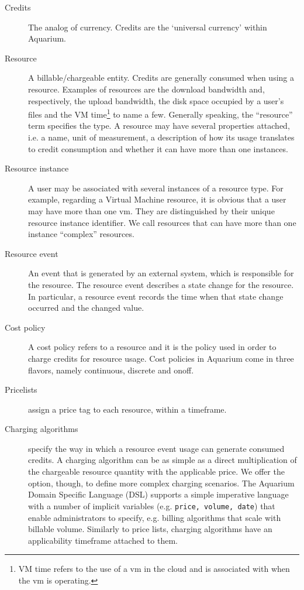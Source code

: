 \documentclass[preprint,10pt]{sigplanconf}
\begin{document}
\begin{description}
\item[Credits]
The analog of currency. Credits are the `universal currency' within Aquarium.

\item[Resource]
    A billable/chargeable entity. Credits are generally consumed when using a resource. Examples of resources are the \textsf{download bandwidth} and, respectively,  the \textsf{upload bandwidth}, the \textsf{disk space} occupied by a user's files and the \textsf{VM time}\footnote{\textsf{VM time} refers to the use of a {\sc vm} in the cloud and is associated with when the {\sc vm} is operating.} to name a few. Generally speaking, the ``resource'' term specifies the type. A resource may have several properties attached, i.e. a name, unit of measurement, a description of how its usage translates to credit consumption and whether it can have more than one instances.

\item[Resource instance]
    A user may be associated with several instances of a resource type. For example, regarding a \textsf{Virtual Machine} resource, it is obvious that a user may have more than one {\sc vm}. They are distinguished by their unique resource instance identifier. We call resources that can have more than one instance ``complex'' resources.

\item[Resource event]
An event that is generated by an external system, which is responsible for the resource.
The resource event describes a state change for the resource. In particular, a resource event records the time when that state change occurred and the changed value.

\item[Cost policy]
A cost policy refers to a resource and it is the policy used in order to charge credits for resource usage. Cost policies in Aquarium come in three flavors, namely \textsf{continuous}, \textsf{discrete} and \textsf{onoff}.
          
\item[Pricelists] assign a price tag to each resource, within a timeframe.

\item[Charging algorithms] specify the way in which a resource event usage can generate consumed credits. 
A charging algorithm can be as simple as a direct multiplication of the 
        chargeable resource quantity with the applicable price. We offer the option, though, to define more complex charging  scenarios. The Aquarium Domain Specific Language (DSL) supports a simple imperative language with
        a number of implicit variables (e.g. \texttt{price, volume, date}) 
        that enable administrators to specify, e.g. billing algorithms that
        scale with billable volume. Similarly to price lists, charging algorithms
        have an applicability timeframe attached to them.
        

\end{description}
\end{document}
